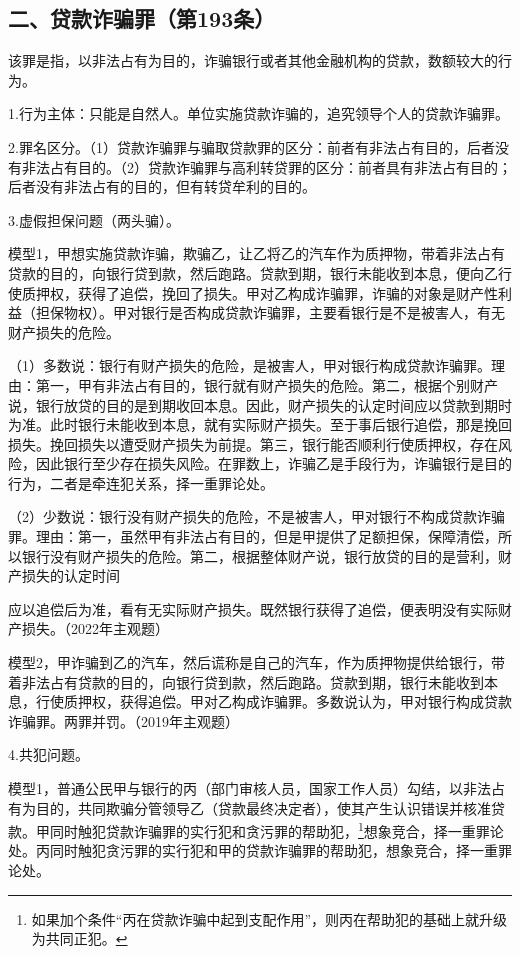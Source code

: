 \subsection*{二、贷款诈骗罪（第193条）}

该罪是指，以非法占有为目的，诈骗银行或者其他金融机构的贷款，数额较大的行为。

1.行为主体：只能是自然人。单位实施贷款诈骗的，追究领导个人的贷款诈骗罪。

2.罪名区分。（1）贷款诈骗罪与骗取贷款罪的区分：前者有非法占有目的，后者没有非法占有目的。（2）贷款诈骗罪与高利转贷罪的区分：前者具有非法占有目的；后者没有非法占有的目的，但有转贷牟利的目的。

3.虚假担保问题（两头骗）。

模型1，甲想实施贷款诈骗，欺骗乙，让乙将乙的汽车作为质押物，带着非法占有贷款的目的，向银行贷到款，然后跑路。贷款到期，银行未能收到本息，便向乙行使质押权，获得了追偿，挽回了损失。甲对乙构成诈骗罪，诈骗的对象是财产性利益（担保物权）。甲对银行是否构成贷款诈骗罪，主要看银行是不是被害人，有无财产损失的危险。

（1）多数说：银行有财产损失的危险，是被害人，甲对银行构成贷款诈骗罪。理由：第一，甲有非法占有目的，银行就有财产损失的危险。第二，根据个别财产说，银行放贷的目的是到期收回本息。因此，财产损失的认定时间应以贷款到期时为准。此时银行未能收到本息，就有实际财产损失。至于事后银行追偿，那是挽回损失。挽回损失以遭受财产损失为前提。第三，银行能否顺利行使质押权，存在风险，因此银行至少存在损失风险。在罪数上，诈骗乙是手段行为，诈骗银行是目的行为，二者是牵连犯关系，择一重罪论处。

（2）少数说：银行没有财产损失的危险，不是被害人，甲对银行不构成贷款诈骗罪。理由：第一，虽然甲有非法占有目的，但是甲提供了足额担保，保障清偿，所以银行没有财产损失的危险。第二，根据整体财产说，银行放贷的目的是营利，财产损失的认定时间

应以追偿后为准，看有无实际财产损失。既然银行获得了追偿，便表明没有实际财产损失。（2022年主观题）

模型2，甲诈骗到乙的汽车，然后谎称是自己的汽车，作为质押物提供给银行，带着非法占有贷款的目的，向银行贷到款，然后跑路。贷款到期，银行未能收到本息，行使质押权，获得追偿。甲对乙构成诈骗罪。多数说认为，甲对银行构成贷款诈骗罪。两罪并罚。（2019年主观题）

4.共犯问题。

模型1，普通公民甲与银行的丙（部门审核人员，国家工作人员）勾结，以非法占有为目的，共同欺骗分管领导乙（贷款最终决定者），使其产生认识错误并核准贷款。甲同时触犯贷款诈骗罪的实行犯和贪污罪的帮助犯，\footnote{如果加个条件“丙在贷款诈骗中起到支配作用”，则丙在帮助犯的基础上就升级为共同正犯。}想象竞合，择一重罪论处。丙同时触犯贪污罪的实行犯和甲的贷款诈骗罪的帮助犯，想象竞合，择一重罪论处。

